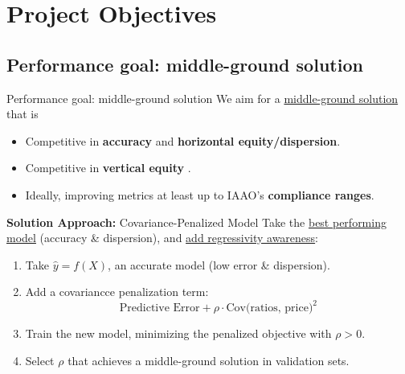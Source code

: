 \documentclass[aspectratio=169,10pt]{beamer}
\begin{document}
\newcommand{\sectionC}{Project Objectives}
\section{\sectionC}

\newcommand{\frameE}{Performance goal: middle-ground solution}
\subsection{\frameE}
\begin{frame}{\frameE}
    We aim for a \underline{middle-ground solution} that is
   \medskip
   \begin{itemize}
  \item Competitive in \textbf{accuracy} and \textbf{horizontal equity/dispersion}.
  \item Competitive in \textbf{vertical equity} .
  \item Ideally, improving metrics at least up to IAAO's \textbf{compliance ranges}.\\
   \end{itemize}

   \medskip

   \begin{block}{ \textbf{Solution Approach:} Covariance-Penalized Model}
       Take the \underline{best performing model} (accuracy \& dispersion), and \underline{add regressivity awareness}:
       
       

        \medskip

\begin{enumerate}
    \item Take $\hat{y}=f(X)$, an accurate model (low error \& dispersion).
    \item Add a covariancce penalization term: $$ \text{Predictive Error} + \rho \cdot  \text{Cov(ratios, price)}^2$$
    \item Train the new model, minimizing the penalized objective with $\rho>0$.
    \item Select $\rho$ that achieves a middle-ground solution in validation sets.
\end{enumerate}

   \end{block}
\end{frame}
\end{document}
